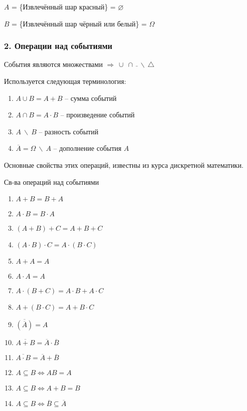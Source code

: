 $A$ = \{Извлечённый шар красный\} = $\varnothing$

$B$ = \{Извлечённый шар чёрный или белый\} = $\Omega$

\subsubsection*{2. Операции над событиями}

События являются множествами $\Rightarrow~\cup~\cap~\bar~~\backslash~\triangle$

Используется следующая терминология:
\begin{enumerate}[topsep=0pt, leftmargin=18pt, noitemsep]
	\item $A \cup B = A + B$ -- сумма событий
	
	\item $A \cap B = A \cdot B$ -- произведение событий
	
	\item $A ~\backslash~ B$ -- разность событий
	
	\item $\overline{A}=\Omega~\backslash~ A$ -- дополнение события $A$
\end{enumerate}

Основные свойства этих операций, известны из курса дискретной математики.

Св-ва операций над событиями
\begin{enumerate}[topsep=0pt, leftmargin=20pt, noitemsep, label=\arabic*\degree]
	\item $A+B=B+A$
	
	\item $A \cdot B = B \cdot A$
	
	\item $(A+B)+C=A+B+C$
	
	\item $(A\cdot B)\cdot C = A\cdot(B\cdot C)$
	
	\item $A+A=A$
	
	\item $A\cdot A = A$
	
	\item $A\cdot (B+C) = A\cdot B + A\cdot C$
	
	\item $A+(B\cdot C) = A + B\cdot C$
	
	\item $\overline{(\overline{A})} = A$
	
	\item $\overline{A+B} = \overline{A}\cdot\overline{B}$
	
	\item $\overline{A\cdot B} = \overline{A} + \overline{B}$
	
	\item $A\subseteq B \Leftrightarrow AB = A$
	
	\item $A\subseteq B \Leftrightarrow A+B=B$
	
	\item $A\subseteq B \Leftrightarrow \overline{B}\subseteq\overline{A}$
\end{enumerate}

